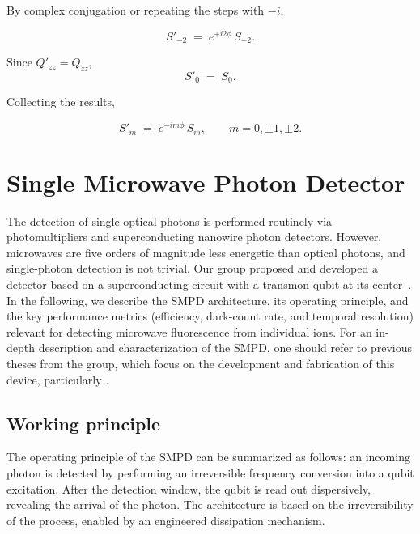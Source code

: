 By complex conjugation or repeating the steps with $-i$,

\begin{equation}
S'_{-2} \;=\; e^{+i2\phi}\,S_{-2}.
\end{equation}

Since $Q'_{zz}=Q_{zz}$,
\begin{equation}
S'_0 \;=\; S_0.
\end{equation}

Collecting the results,

\begin{equation}
S'_m \;=\; e^{-im\phi}\,S_m,\qquad m=0,\pm1,\pm2.
\end{equation}


\chapter{Single Microwave Photon Detector}
\label{app:SMPD}

The detection of single optical photons is performed routinely via photomultipliers and superconducting nanowire photon detectors. However, microwaves are five orders of magnitude less energetic than optical photons, and single-photon detection is not trivial. Our group proposed and developed a detector based on a superconducting circuit with a transmon qubit at its center~. In the following, we describe the SMPD architecture, its operating principle, and the key performance metrics (efficiency, dark-count rate, and temporal resolution) relevant for detecting microwave fluorescence from individual \Er ions. For an in-depth description and characterization of the SMPD, one should refer to previous theses from the group, which focus on the development and fabrication of this device, particularly \cite{albertinale_detecting_2021,balembois_magnetic_2023,pallegoix_high_2025}.

\section{Working principle}

The operating principle of the SMPD can be summarized as follows: an incoming photon is detected by performing an irreversible frequency conversion into a qubit excitation. After the detection window, the qubit is read out dispersively, revealing the arrival of the photon. The architecture is based on the irreversibility of the process, enabled by an engineered dissipation mechanism.

